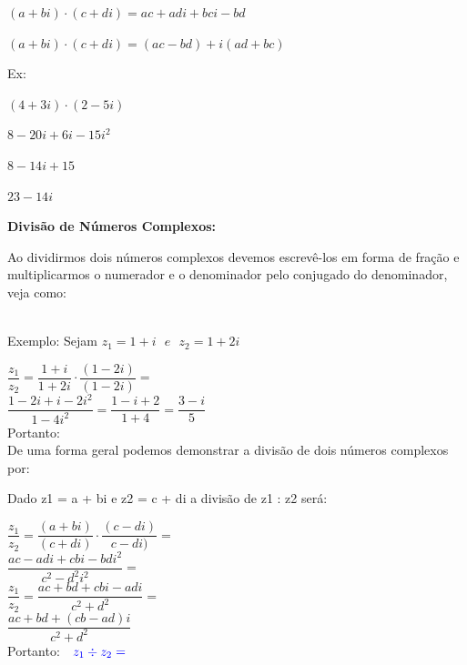 \begin{multicols*}{2}
		$ (a + bi) \cdot (c + di) = ac + adi +bci - bd $
		
		$ (a +bi) \cdot (c + di) = (ac - bd) + i(ad + bc) $
		
		Ex:
		
		$ (4 + 3i) \cdot (2 - 5i) $
		
		$ 8 -20i + 6i - 15i^2 $
		
		$ 8 - 14i + 15 $
		
		$ 23 - 14i $
		
		\textbf{Divisão de Números Complexos:}
		
		Ao dividirmos dois números complexos devemos escrevê-los em forma de fração e multiplicarmos o numerador e o denominador pelo conjugado do denominador, veja como:
		
		\\
		
		Exemplo: Sejam $ z_1 = 1 + i  \ \ \  e \ \ \  z_2 = 1 +2i $
		
		 $ \dfrac{z_1}{z_2} = \dfrac{1 + i}{1 + 2i} \cdot \dfrac{(1 - 2i)}{(1 - 2i)} = $\\
		 
		 $ \dfrac{1 - 2i + i -2i^2}{1 - 4i^2} = \dfrac{1 - i + 2}{1 +4} = \dfrac{3 - i}{5} $\\
		 
		 Portanto: \\
		 
		 De uma forma geral podemos demonstrar a divisão de dois números complexos por:

		Dado z1 = a + bi e z2 = c + di a divisão de z1 : z2 será:
		
		$ \dfrac{z_1}{z_2} = \dfrac{(a + bi)}{(c + di)} \cdot \dfrac{(c - di)}{c - di)} = $ \\
		
		$ \dfrac{ac - adi + cbi - bdi^2}{c^2 - d^2i^2} = $\\
		
		$ \dfrac{z_1}{z_2}= \dfrac{ac + bd + cbi - adi}{c^2 + d^2}= $\\
		
		$ \dfrac{ac + bd + (cb - ad)i}{c^2 + d^2} $\\
		
		Portanto: $\color{blue} \ \ z_1 \div z_2= $\\
		
		

\end{multicols*}
